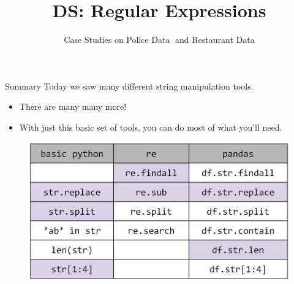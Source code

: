 \documentclass[aspectratio=169]{../latex_main/tntbeamer}  %
\title[Introduction]{DS: Regular Expressions}
\subtitle{Case Studies on Police Data and Restaurant Data}
\begin{document}
	
	\maketitle
	\begin{frame}{Summary}
	    Today we saw many different string manipulation tools.
	    \begin{itemize}
	        \item There are many many more!
	        \item With just this basic set of tools, you can do most of what you’ll need.
	    \end{itemize}
	    \begin{figure}
	        \centering
	        \includegraphics[scale=.35]{Bild28}
	    \end{figure}
	\end{frame}
	
\end{document}
